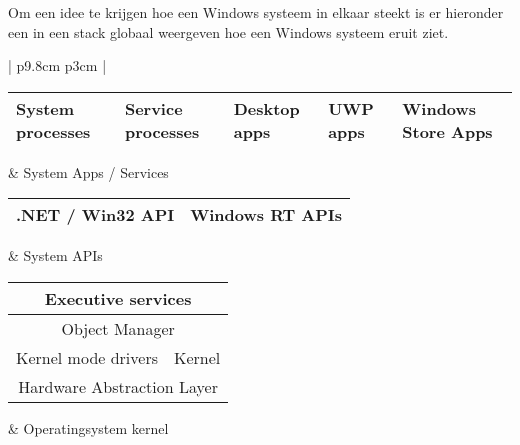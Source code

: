 Om een idee te krijgen hoe een Windows systeem in elkaar steekt is er hieronder een in een stack globaal weergeven hoe een Windows systeem eruit ziet.
\begin{center}
 \begin{tabular}{ | p{9.8cm} p{3cm} | }
 \hline
	    \rule[-2em]{0pt}{4.5em}\begin{tabular}{ | p{1.5cm} | p{1.5cm} | p{1.5cm} |  p{1.5cm} | p{1.5cm} | }
            \hline
		    \cellcolor{orange!25}System processes & \cellcolor{cyan!25}Service processes & \cellcolor{yellow!25}Desktop apps & \cellcolor{green!25}UWP apps & \cellcolor{blue!25}Windows Store Apps \\ 
            \hline
            \end{tabular}
	&
	System Apps / Services \\
 \hline
	    \rule[-1.5em]{0pt}{3.5em}\begin{tabular}{ | p{6.5cm} | p{2.3cm} | }
	    \hline
	    \cellcolor{yellow!25}.NET / Win32 API & \cellcolor{blue!25}Windows RT APIs \\ 
            \hline
            \end{tabular}
	&
	System APIs \\
 \hline
	    \rule[-2.75em]{0pt}{6em}\begin{tabular}{ | p{4.4cm} | p{4.4cm} | }
            \hline
	    \multicolumn{2}{|c|}{\cellcolor{red!25}{}Executive services} \\ 
            \hline
	    \multicolumn{2}{|c|}{\cellcolor{red!25}{}Object Manager} \\ 
            \hline
	    \cellcolor{magenta!25}\hfill Kernel mode drivers \hfill \mbox{} &
	    \cellcolor{olive!25}\hfill Kernel \hfill \mbox{} \\
            \hline
	    \multicolumn{2}{|c|}{\cellcolor{olive!25}{}Hardware Abstraction Layer} \\ 
            \hline
            \end{tabular}
	&
	Operatingsystem kernel \\
 \hline
\end{tabular}
\end{center}


